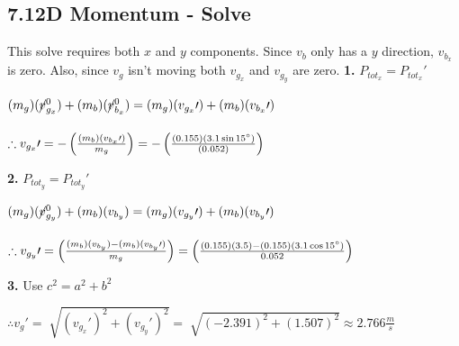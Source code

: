 \subsection*{7.1\hspace*{0.5cm}2D Momentum - Solve}
This solve requires both $x$ and $y$ components. Since $v_{b}$ only has a $y$ direction, $v_{b_{x}}$ is zero. Also, since $v_{g}$ isn't moving both $v_{g_{x}}$ and $v_{g_{y}}$ are zero.\newline\newline
\textbf{1.} $P_{tot_{x}} = P_{tot_{x}}\prime$ \\
\begin{adjustwidth}{0.6cm}{0pt}
    $(m_{g})(\cancel{v}_{g_{x}}^0) + (m_{b})(\cancel{v}_{b_{x}}^0) = (m_{g})(v_{g_{x}}\prime) + (m_{b})(v_{b_{x}}\prime)$ \\\\
    $\therefore v_{g_{x}}\prime = -\left(\frac{(m_{b})(v_{b_{x}}\prime)}{m_{g}}\right) = -\left(\frac{(0.155)(3.1\sin15\degree)}{(0.052)}\right)$
\end{adjustwidth}\vspace*{15pt}
\textbf{2.} $P_{tot_{y}} = P_{tot_{y}}\prime$ \\
\begin{adjustwidth}{0.6cm}{0pt}
    $(m_{g})(\cancel{v}_{g_{y}}^0) + (m_{b})(v_{b_{y}}) = (m_{g})(v_{g_{y}}\prime) + (m_{b})(v_{b_{y}}\prime)$ \\\\
    $\therefore v_{g_{y}}\prime = \left(\frac{(m_{b})(v_{b_{y}}) - (m_{b})(v_{b_{y}}\prime)}{m_{g}}\right) = \left(\frac{(0.155)(3.5) - (0.155)(3.1\cos15\degree)}{0.052}\right)$
\end{adjustwidth}\vspace*{15pt}
\noindent\textbf{3.} Use $c^2 = a^2 + b^2$ \\
\begin{adjustwidth}{0.6cm}{0pt}
    $\therefore v_{g}\prime = \sqrt[]{{(v_{g_{x}}\prime)}^2 + {(v_{g_{y}}\prime)}^2} = \sqrt[]{{(-2.391)}^2 + {(1.507)}^2} \approx 2.766 \frac{m}{s} $
\end{adjustwidth}